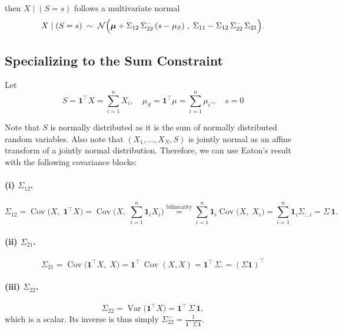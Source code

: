 \documentclass{article}
\begin{document}
 then $X\mid (S=s)$ follows a multivariate normal
\[
X\mid (S=s)
\;\sim\;
\mathcal{N}\Bigl(
\boldsymbol{\mu} + \Sigma_{12}\,\Sigma_{22}^{-}\,(s-\mu_S)\;,\;
\Sigma_{11} - \Sigma_{12}\,\Sigma_{22}^{-}\,\Sigma_{21}
\Bigr).
\]



\subsection*{Specializing to the Sum Constraint}
Let
\[
S = \mathbf{1}^\top X = \sum_{i=1}^n X_i,
\quad
\mu_S = \mathbf{1}^\top\mu = \sum_{i=1}^n \mu_i.,
\quad s=0
\]

Note that $S$ is normally distributed as it is the sum of normally distributed random variables. Also note that $(X_1, ..., X_N, S)$ is jointly normal as an affine transform of a jointly normal distribution. Therefore, we can use Eaton's result with the following covariance blocks:

\paragraph{(i)  \(\Sigma_{12}\).}
\[
\Sigma_{12}
= \operatorname{Cov}\bigl(X,\;\mathbf{1}^\top X\bigr)
= \operatorname{Cov}\bigl(X,\; \sum_{i=1}^n\mathbf{1}_iX_i\bigr)
\overset{\text{bilinearity}}{=}
\sum_{i=1}^n\mathbf{1}_i\operatorname{Cov}\bigl(X,\; X_i\bigr)
= \sum_{i=1}^n\mathbf{1}_i\Sigma_{:,i} = \Sigma\,\mathbf{1}.
\]

\paragraph{(ii)  \(\Sigma_{21}\).}
\[
\Sigma_{21}
= \operatorname{Cov}\bigl(\mathbf{1}^\top X,\;X\bigr)
= \mathbf{1}^\top\,\operatorname{Cov}(X,X)
= \mathbf{1}^\top\,\Sigma.
= (\Sigma \mathbf{1})^\top\]

\paragraph{(iii)  \(\Sigma_{22}\).}
\[
\Sigma_{22}
= \operatorname{Var}\bigl(\mathbf{1}^\top X\bigr)
= \mathbf{1}^\top\,\Sigma\,\mathbf{1},
\]
which is a scalar.  Its inverse is thus simply
\(\displaystyle
\Sigma_{22}^- = \tfrac{1}{\mathbf{1}^\top\Sigma\,\mathbf{1}}.
\)
\end{document}
